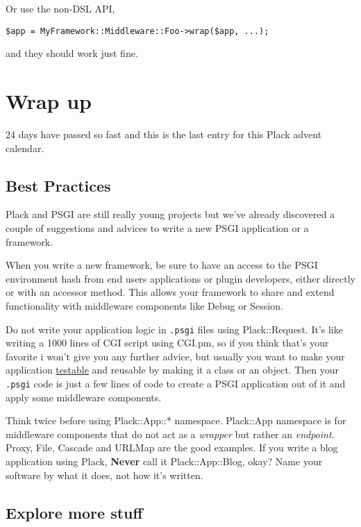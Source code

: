 Or use the non-DSL API,

\begin{lstlisting}
$app = MyFramework::Middleware::Foo->wrap($app, ...);
\end{lstlisting}

and they should work just fine.

\chapter{Wrap up}\label{day-24-wrap-up}

24 days have passed so fast and this is the last entry for this Plack
advent calendar.

\section{Best Practices}\label{best-practices}

Plack and PSGI are still really young projects but we've already
discovered a couple of suggestions and advices to write a new PSGI
application or a framework.

When you write a new framework, be sure to have an access to the PSGI
environment hash from end users applications or plugin developers,
either directly or with an accessor method. This allows your framework
to share and extend functionality with middleware components like Debug
or Session.

Do not write your application logic in \lstinline!.psgi! files using
Plack::Request. It's like writing a 1000 lines of CGI script using
CGI.pm, so if you think that's your favorite i won't give you any
further advice, but usually you want to make your application
\href{http://advent.plackperl.org/2009/12/day-13-use-placktest-to-test-your-application.html}{testable}
and reusable by making it a class or an object. Then your
\lstinline!.psgi! code is just a few lines of code to create a PSGI
application out of it and apply some middleware components.

Think twice before using Plack::App::* namespace. Plack::App namespace
is for middleware components that do not act as a \emph{wrapper} but
rather an \emph{endpoint}. Proxy, File, Cascade and URLMap are the good
examples. If you write a blog application using Plack, \textbf{Never}
call it Plack::App::Blog, okay? Name your software by what it does, not
how it's written.

\section{Explore more stuff}\label{explore-more-stuff}

